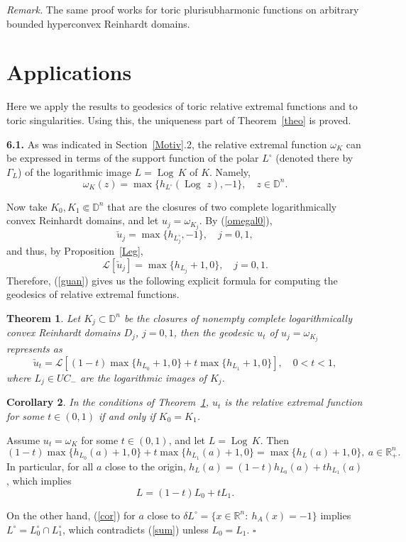 \documentclass[12pt]{article}
\newcommand{\beq}{\begin{equation}}
\newcommand{\eeq}{\end{equation}}
\numberwithin{equation}{section}
\newtheorem{theorem}{Theorem}[section]
\newtheorem{corollary}[theorem]{Corollary}
\newenvironment{proof}{\medbreak\noindent{\it Proof.}\rm}{\hfill$\square$\rm}
\newcommand{\Log}{{\operatorname{Log}\,}}
\newcommand{\D}{{\mathbb D}}
\newcommand{\Rn}{{\mathbb R}^n}
\newcommand{\Rnp}{{\mathbb R}_+^n}
\newcommand{\cL}{{\mathcal  L}}
\begin{document}
\medskip
{\it Remark.} The same proof works for toric plurisubharmonic functions on arbitrary bounded hyperconvex Reinhardt domains.


\section{Applications}\label{Appl}

Here we apply the results to geodesics of toric relative extremal functions and to toric singularities. Using this, the uniqueness part of Theorem~\ref{theo} is proved.

\bigskip
\noindent
{\bf 6.1.} As was indicated in Section~\ref{Motiv}.2, the relative extremal function $\omega_K$ can be expressed in terms of the support function of the polar $L^\circ$ (denoted there by $\Gamma_L$) of the logarithmic image $L=\Log K$ of $K$. Namely,
\beq\label{omegal0} \omega_K(z)=\max \{h_{L^\circ}(\Log\, z),-1\}, \quad z\in \D^n.\eeq


 Now take $K_0,K_1\Subset\D^n$ that are the closures of two complete logarithmically convex Reinhardt domains, and let $u_j=\omega_{K_j}$. By (\ref{omegal0}),
 $$ \check u_j =\max\{h_{L_j^\circ},-1\},\quad j=0,1,$$
 and thus, by Proposition~\ref{Leg},
 $$\cL[\check u_j] =\max\{h_{L_j}+1,0\},\quad j=0,1.$$
Therefore, (\ref{guan}) gives us the following explicit formula for computing the geodesics of relative extremal functions.

\begin{theorem}\label{formula}
Let $K_j\subset\D^n$ be the closures of nonempty complete logarithmically convex Reinhardt domains $D_j$, $j=0,1$, then the geodesic $u_t$  of $u_j=\omega_{K_j}$ represents as
$$ \check u_t=\cL[(1-t)\max\{h_{L_0}+1,0\} + t \max\{h_{L_1}+1,0\}],\quad 0<t<1,$$
where $L_j\in UC_-$ are the logarithmic images of $K_j$.
\end{theorem}

\begin{corollary}\label{uniq} In the conditions of Theorem~\ref{formula}, $u_t$ is the relative extremal function for some $t\in (0,1)$ if and only if $K_0=K_1$.
\end{corollary}

\begin{proof} Assume $u_t=\omega_K$ for some $t\in (0,1)$, and let $L=\Log K$. Then
\beq\label{cor} (1-t)\max\{h_{L_0}(a)+1,0\} + t \max\{h_{L_1}(a)+1,0\}=\max\{h_L(a)+1,0\},\ a\in\Rnp.\eeq
In particular, for all $a$ close to the origin, $h_L(a)=(1-t)h_{L_0}(a)+ t h_{L_1}(a)$, which implies
\beq\label{sum} L=(1-t)L_0 + t L_1.\eeq

On the other hand, (\ref{cor}) for $a$ close to $\delta L^\circ=\{x\in\Rn:\: h_A(x)= -1\}$ implies $L^\circ =L_0^\circ\cap L_1^\circ$, which contradicts (\ref{sum}) unless $L_0=L_1$.
\end{proof}
\end{document}
